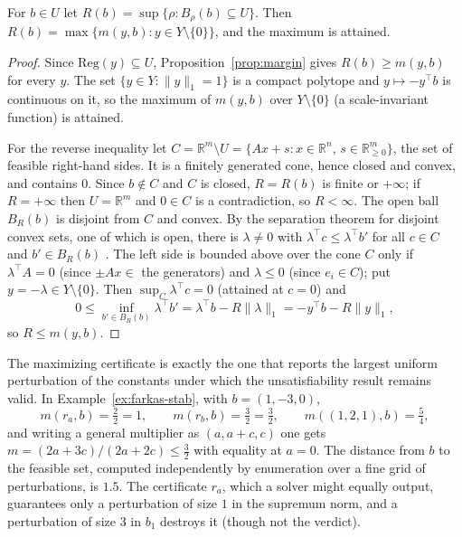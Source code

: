 \begin{theorem}
\label{thm:radius}
For $b\in U$ let $R(b)=\sup\{\rho:B_\rho(b)\subseteq U\}$. Then $R(b)=\max\{m(y,b):y\in Y\setminus\{0\}\}$, and the maximum is attained.
\end{theorem}

\begin{proof}
Since $\mathrm{Reg}(y)\subseteq U$, Proposition~\ref{prop:margin} gives $R(b)\ge m(y,b)$ for every $y$. The set $\{y\in Y:\|y\|_1=1\}$ is a compact polytope and $y\mapsto-y^{\top}b$ is continuous on it, so the maximum of $m(y,b)$ over $Y\setminus\{0\}$ (a scale-invariant function) is attained.

For the reverse inequality let $C=\mathbb{R}^m\setminus U=\{Ax+s:x\in\mathbb{R}^n,\,s\in\mathbb{R}^m_{\ge0}\}$, the set of feasible right-hand sides. It is a finitely generated cone, hence closed and convex, and contains $0$. Since $b\notin C$ and $C$ is closed, $R=R(b)$ is finite or $+\infty$; if $R=+\infty$ then $U=\mathbb{R}^m$ and $0\in C$ is a contradiction, so $R<\infty$. The open ball $B_R(b)$ is disjoint from $C$ and convex. By the separation theorem for disjoint convex sets, one of which is open, there is $\lambda\ne0$ with $\lambda^{\top}c\le\lambda^{\top}b'$ for all $c\in C$ and $b'\in B_R(b)$ . The left side is bounded above over the cone $C$ only if $\lambda^{\top}A=0$ (since $\pm Ax\in$ the generators) and $\lambda\le0$ (since $e_i\in C$); put $y=-\lambda\in Y\setminus\{0\}$. Then $\sup_C\lambda^{\top}c=0$ (attained at $c=0$) and
\[
0\le\inf_{b'\in B_R(b)}\lambda^{\top}b'=\lambda^{\top}b-R\|\lambda\|_1=-y^{\top}b-R\|y\|_1,
\]
so $R\le m(y,b)$.
\end{proof}

The maximizing certificate is exactly the one that reports the largest uniform perturbation of the constants under which the unsatisfiability result remains valid. In Example~\ref{ex:farkas-stab}, with $b=(1,-3,0)$,
\[
m(r_a,b)=\tfrac{2}{2}=1,\qquad m(r_b,b)=\tfrac{3}{2}=\tfrac32,\qquad m((1,2,1),b)=\tfrac54,
\]
and writing a general multiplier as $(a,a+c,c)$ one gets $m=(2a+3c)/(2a+2c)\le\tfrac32$ with equality at $a=0$. The distance from $b$ to the feasible set, computed independently by enumeration over a fine grid of perturbations, is $1.5$. The certificate $r_a$, which a solver might equally output, guarantees only a perturbation of size $1$ in the supremum norm, and a perturbation of size $3$ in $b_1$ destroys it (though not the verdict).

